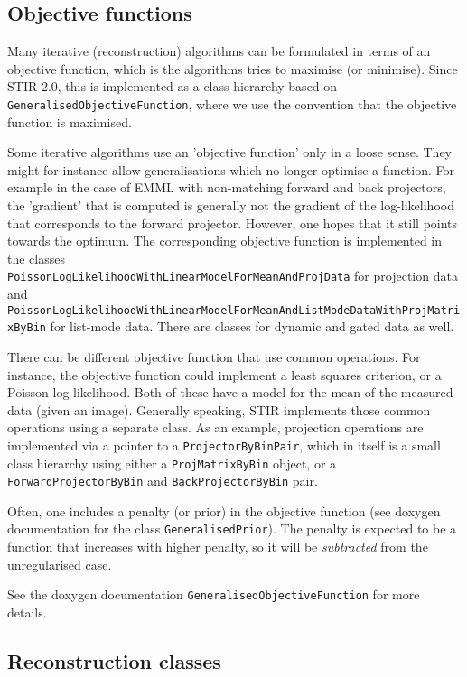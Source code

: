 \documentclass{article}
\begin{document}
\subsection{Objective functions}
Many iterative (reconstruction) algorithms can be formulated in terms
of an objective function, which is the algorithms tries to 
maximise (or minimise). Since STIR 2.0, this is implemented
as a class hierarchy based on \texttt{GeneralisedObjectiveFunction},
where we use the convention that the objective function is maximised. 

Some iterative algorithms use an 'objective function' only in a 
loose sense. They might for instance allow generalisations 
which no longer optimise a function. For example in the case
of EMML with non-matching forward and back projectors, the 'gradient' 
that is computed is generally not the gradient of the
log-likelihood that corresponds to the forward projector.
However, one hopes that it still points towards the optimum.
The corresponding objective function is implemented in the classes\\
\texttt{PoissonLogLikelihoodWithLinearModelForMeanAndProjData} for
projection data and \texttt{PoissonLogLikelihoodWithLinearModelForMeanAndListModeDataWithProjMatrixByBin}
for list-mode data. There are classes for dynamic and gated data as well.

There can be different objective function that use common operations.
For instance, the objective function could implement a least squares
criterion, or a Poisson log-likelihood. Both of these have a model
for the mean of the measured data (given an image). Generally speaking,
STIR implements those common operations using a separate class.
As an example, projection operations are implemented via a pointer to a 
\texttt{ProjectorByBinPair}, which in itself is a small
class hierarchy using either a \texttt{ProjMatrixByBin} object, 
or a \texttt{ForwardProjectorByBin} and \texttt{BackProjectorByBin} pair.

Often, one includes a penalty (or prior) in the objective function
(see doxygen documentation for the class \texttt{GeneralisedPrior}).
The penalty is expected to be a function that increases with higher 
penalty, so it will be \textit{subtracted}
from the unregularised case.

See the doxygen documentation \texttt{GeneralisedObjectiveFunction} for
more details.

\subsection{
Reconstruction classes}
\end{document}
